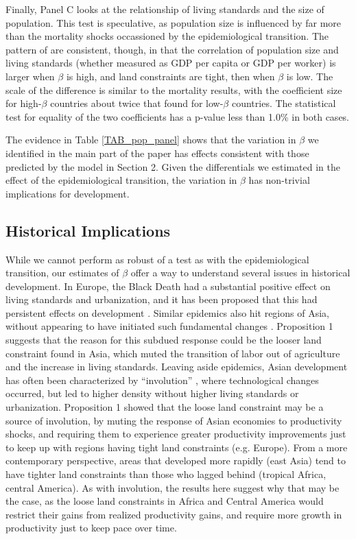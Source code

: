 \documentclass[11pt]{article}
\begin{document}
Finally, Panel C looks at the relationship of living standards and the size of population. This test is speculative, as population size is influenced by far more than the mortality shocks occassioned by the epidemiological transition. The pattern of are consistent, though, in that the correlation of population size and living standards (whether measured as GDP per capita or GDP per worker) is larger when $\beta$ is high, and land constraints are tight, then when $\beta$ is low. The scale of the difference is similar to the mortality results, with the coefficient size for high-$\beta$ countries about twice that found for low-$\beta$ countries. The statistical test for equality of the two coefficients has a p-value less than 1.0\% in both cases.

The evidence in Table \ref{TAB_pop_panel} shows that the variation in $\beta$ we identified in the main part of the paper has effects consistent with those predicted by the model in Section 2. Given the differentials we estimated in the effect of the epidemiological transition, the variation in $\beta$ has non-trivial implications for development.

\subsection{Historical Implications}
While we cannot perform as robust of a test as with the epidemiological transition, our estimates of $\beta$ offer a way to understand several issues in historical development. In Europe, the Black Death had a substantial positive effect on living standards and urbanization, and it has been proposed that this had persistent effects on development \citep{vv08,vv13}. Similar epidemics also hit regions of Asia, without appearing to have initiated such fundamental changes \citep{McNeill1976}. Proposition 1 suggests that the reason for this subdued response could be the looser land constraint found in Asia, which muted the transition of labor out of agriculture and the increase in living standards. Leaving aside epidemics, Asian development has often been characterized by ``involution'' \citep{Geertz1963,Huang1990,huang2002}, where technological changes occurred, but led to higher density without higher living standards or urbanization. Proposition 1 showed that the loose land constraint may be a source of involution, by muting the response of Asian economies to productivity shocks, and requiring them to experience greater productivity improvements just to keep up with regions having tight land constraints (e.g. Europe). From a more contemporary perspective, areas that developed more rapidly (east Asia) tend to have tighter land constraints than those who lagged behind (tropical Africa, central America). As with involution, the results here suggest why that may be the case, as the loose land constraints in Africa and Central America would restrict their gains from realized productivity gains, and require more growth in productivity just to keep pace over time. 
\end{document}
